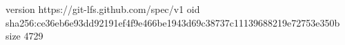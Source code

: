 version https://git-lfs.github.com/spec/v1
oid sha256:ce36eb6e93dd92191ef4f9e466be1943d69c38737c11139688219e72753e350b
size 4729
